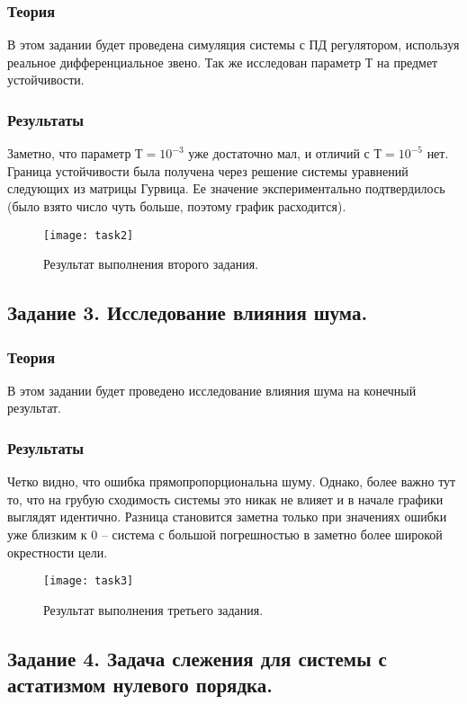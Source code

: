 \documentclass[16pt]{article}
\begin{document}
\subsubsection{Теория}
В этом задании будет проведена симуляция системы с ПД регулятором, используя реальное дифференциальное звено.
Так же исследован параметр Т на предмет устойчивости.
\subsubsection{Результаты}
Заметно, что параметр \(Т=10^{-3}\) уже достаточно мал, и отличий с \(Т=10^{-5}\) нет. Граница устойчивости была получена через решение системы уравнений следующих из матрицы Гурвица. Ее значение экспериментально подтвердилось (было взято число чуть больше, поэтому график расходится).
\begin{figure}[h!]
    \centering
    \texttt{[image: task2]}
    \caption{Результат выполнения второго задания.}
    \label{fig:fig2}
\end{figure}

\pagebreak

\subsection{Задание 3. Исследование влияния шума.}

\subsubsection{Теория}
В этом задании будет проведено исследование влияния шума на конечный результат.
\subsubsection{Результаты}
Четко видно, что ошибка прямопропорциональна шуму. Однако, более важно тут то, что на грубую сходимость системы это никак не влияет и в начале графики выглядят идентично. Разница становится заметна только при значениях ошибки уже близким к 0 -- система с большой погрешностью в заметно более широкой окрестности цели.
\begin{figure}[h!]
    \centering
    \texttt{[image: task3]}
    \caption{Результат выполнения третьего задания.}
    \label{fig:fig3}
\end{figure}

\pagebreak

\subsection{Задание 4. Задача слежения для системы с астатизмом нулевого порядка.}
\end{document}
